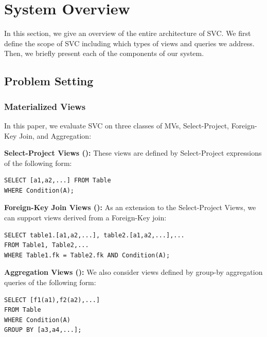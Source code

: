 \section{System Overview}\label{sec-arch}
In this section, we give an overview of the entire architecture of SVC.
We first define the scope of SVC including which types of views and queries we address.
Then, we briefly present each of the components of our system.

\subsection{Problem Setting}
\vspace{-.5em}
\subsubsection{Materialized Views}
In this paper, we evaluate SVC on three classes of MVs, Select-Project, Foreign-Key Join, and Aggregation:
\vspace{0.25em}

\noindent\textbf{Select-Project Views (\spview): } These views are defined by Select-Project
expressions of the following form:

\begin{lstlisting}
SELECT [a1,a2,...] FROM Table 
WHERE Condition(A);
\end{lstlisting}

\vspace{0.25em}

\noindent\textbf{Foreign-Key Join Views (\fjview): } As an extension to the Select-Project Views, we can support views derived from a Foreign-Key join:

\begin{lstlisting}
SELECT table1.[a1,a2,...], table2.[a1,a2,...],...
FROM Table1, Table2,...
WHERE Table1.fk = Table2.fk AND Condition(A);
\end{lstlisting}

\vspace{0.25em}

\noindent\textbf{Aggregation Views (\aggview): } We also consider views defined by group-by aggregation queries of the following form:

\begin{lstlisting}
SELECT [f1(a1),f2(a2),...] 
FROM Table 
WHERE Condition(A)
GROUP BY [a3,a4,...];
\end{lstlisting}

